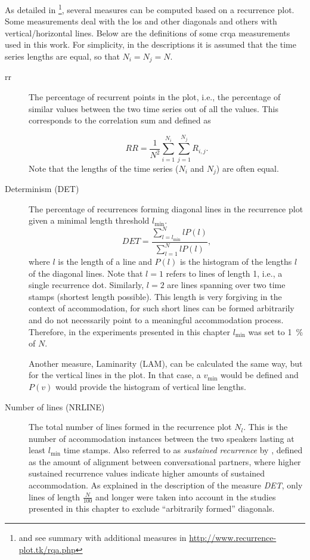 As detailed in \citet{Marwan2007recurrence}\footnote{and see summary with additional measures in \url{http://www.recurrence-plot.tk/rqa.php}}, several measures can be computed based on a recurrence plot.
Some measurements deal with the \ac{los} and other diagonals and others with vertical/horizontal lines.
Below are the definitions of some \ac{crqa} measurements used in this work.
For simplicity, in the descriptions it is assumed that the time series lengths are equal, so that $N_i=N_j=N$.

\begin{description}
	\item[\Acf{rr}] The percentage of recurrent points in the plot, i.e., the percentage of similar values between the two time series out of all the values.
	This corresponds to the correlation sum and defined as
	
	\begin{equation}
		\label{eq:rr}
		RR = \frac{1}{N^2} \sum_{i=1}^{N_i} \sum_{j=1}^{N_j} R_{i,j}.
	\end{equation}
	Note that the lengths of the time series ($N_i$ and $N_j$) are often equal.
		
	\item[Determinism (DET)] The percentage of recurrences forming diagonal lines in the recurrence plot given a minimal length threshold $l_{\min}$.
	\begin{equation}
		\label{eq:det}
		DET = \frac{\sum_{l=l_{\min}}^{N} l P(l)}{\sum_{l=1}^N l P(l)},
	\end{equation}
	where $l$ is the length of a line and $P(l)$ is the histogram of the lengths $l$ of the diagonal lines.
	Note that $l=1$ refers to lines of length 1, i.e., a single recurrence dot.	
	Similarly, $l=2$ are lines spanning over two time stamps (shortest length possible).
	This length is very forgiving in the context of accommodation, for such short lines can be formed arbitrarily and do not necessarily point to a meaningful accommodation process.
	Therefore, in the experiments presented in this chapter $l_{\min}$ was set to \SI{1}{\percent} of $N$.
	
	Another measure, Laminarity (LAM), can be calculated the same way, but for the vertical lines in the plot.
	In that case, a $v_{\min}$ would be defined and $P(v)$ would provide the histogram of vertical line lengths.
	
	\item[Number of lines (NRLINE)] The total number of lines formed in the recurrence plot $N_l$.
	This is the number of accommodation instances between the two speakers lasting at least $l_{\min}$ time stamps.
	Also referred to as \emph{sustained recurrence} by \citet{Borrie2019syncing}, defined as the amount of alignment between conversational partners, where higher sustained recurrence values indicate higher amounts of sustained accommodation.
	As explained in the description of the measure \emph{DET}, only lines of length $\frac{N}{100}$ and longer were taken into account in the studies presented in this chapter to exclude \enquote{arbitrarily formed} diagonals.
	

\end{description}
